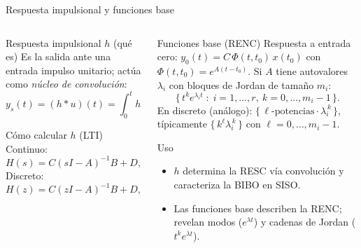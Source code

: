 \documentclass[
    10pt,
    aspectratio=169,
    xcolor={dvipsnames},
    spanish,
    ]{beamer}
\begin{document}
\begin{frame}{Respuesta impulsional y funciones base}
\footnotesize
\begin{columns}[T]
  \begin{column}{0.58\textwidth}
    \begin{block}{Respuesta impulsional $h$ (qué es)}
      Es la salida ante una entrada impulso unitario; actúa como \emph{núcleo de convolución}:
      \[ y_s(t)=(h*u)(t)=\int_{0}^{t} h(t-\tau)\,u(\tau)\,d\tau,\quad Y_s(s)=H(s)\,U(s). \]
    \end{block}
    \begin{block}{Cómo calcular $h$ (LTI)}
      Continuo: 
      \[ H(s)=C(sI{-}A)^{-1}B+D,\quad h(t)=C\,e^{At}\,B + D\,\delta(t)=\mathcal L^{-1}\!\{H(s)\}. \]
      Discreto:
      \[ H(z)=C(zI{-}A)^{-1}B+D,\quad h[0]=D,\; h[k]=C\,A^{k-1}B\ (k\ge1)=\mathcal Z^{-1}\!\{H(z)\}. \]
    \end{block}
  \end{column}
  \begin{column}{0.36\textwidth}
    \begin{block}{Funciones base (RENC)}
      Respuesta a entrada cero: $y_0(t)=C\,\Phi(t,t_0)\,x(t_0)$ con $\Phi(t,t_0)=e^{A(t-t_0)}$.
      Si $A$ tiene autovalores $\lambda_i$ con bloques de Jordan de tamaño $m_i$:
      \[ \{\, t^{k}e^{\lambda_i t}\;:\; i=1,\dots,r,\ k=0,\dots,m_i{-}1\,\}. \]
      En discreto (análogo): $\{\, \ell\text{-potencias}\cdot \lambda_i^{\,k}\,\}$, típicamente $\{\, k^{\ell}\lambda_i^{\,k}\,\}$ con $\ell=0,\dots,m_i{-}1$.
    \end{block}
    \begin{block}{Uso}
      \begin{itemize}\itemsep2pt
        \item $h$ determina la RESC vía convolución y caracteriza la BIBO en SISO.
        \item Las funciones base describen la RENC; revelan modos ($e^{\lambda t}$) y cadenas de Jordan ($t^k e^{\lambda t}$).
      \end{itemize}
    \end{block}
  \end{column}
\end{columns}
\end{frame}
\end{document}
